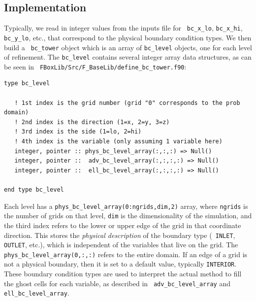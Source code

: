 \subsection{Implementation}
Typically, we read in integer values from the inputs file for {\tt
  bc\_x\_lo}, {\tt bc\_x\_hi}, {\tt bc\_y\_lo}, etc., that correspond
to the physical boundary condition types.  We then build a {\tt
  bc\_tower} object which is an array of {\tt bc\_level} objects, one
for each level of refinement.  The {\tt bc\_level} contains several
integer array data structures, as can be seen in {\tt
  FBoxLib/Src/F\_BaseLib/define\_bc\_tower.f90}:
\begin{lstlisting}[backgroundcolor=\color{light-green}]
type bc_level

   ! 1st index is the grid number (grid "0" corresponds to the prob domain)
   ! 2nd index is the direction (1=x, 2=y, 3=z)
   ! 3rd index is the side (1=lo, 2=hi)
   ! 4th index is the variable (only assuming 1 variable here)
   integer, pointer :: phys_bc_level_array(:,:,:) => Null()
   integer, pointer ::  adv_bc_level_array(:,:,:,:) => Null()
   integer, pointer ::  ell_bc_level_array(:,:,:,:) => Null()

end type bc_level
\end{lstlisting}
Each level has a {\tt phys\_bc\_level\_array(0:ngrids,dim,2)} array,
where {\tt ngrids} is the number of grids on that level, {\tt dim} is
the dimensionality of the simulation, and the third index refers to
the lower or upper edge of the grid in that coordinate direction.
This stores the {\it physical description} of the boundary type ({\tt
  INLET}, {\tt OUTLET}, etc.), which is independent of the variables
that live on the grid.  The {\tt phys\_bc\_level\_array(0,:,:)} refers
to the entire domain.  If an edge of a grid is not a physical
boundary, then it is set to a default value, typically {\tt INTERIOR}.
These boundary condition types are used to interpret the actual method
to fill the ghost cells for each variable, as described in {\tt
  adv\_bc\_level\_array} and {\tt ell\_bc\_level\_array}.

